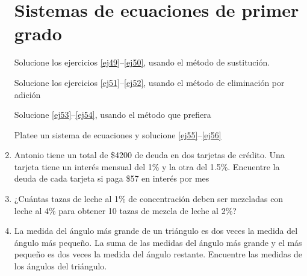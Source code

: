 \documentclass[twoside,letterpaper]{article}
\begin{document}
\begin{multicols}{2}
\begin{enumerate}
\section*{Sistemas de ecuaciones de primer grado}
Solucione los ejercicios \ref{ej49}--\ref{ej50}, usando el método de sustitución.
Solucione los ejercicios \ref{ej51}--\ref{ej52}, usando el método de eliminación por adición
Solucione \ref{ej53}--\ref{ej54}, usando el método que prefiera
Platee un sistema de ecuaciones y solucione \ref{ej55}--\ref{ej56}
\item \label{ej55} Antonio tiene un total de \$4200 de deuda en dos tarjetas de crédito. Una tarjeta tiene un interés mensual del 1\% y la otra del 1.5\%. Encuentre la deuda de cada tarjeta si paga \$57 en interés por mes
\item ¿Cuántas tazas de leche al 1\% de concentración deben ser mezcladas con leche al 4\% para obtener 10 tazas de mezcla de leche al 2\%?
\item \label{ej56} La medida del ángulo más grande de un triángulo es dos veces la medida del ángulo más pequeño. La suma de las medidas del ángulo más grande y el más pequeño es dos veces la medida del ángulo restante. Encuentre las medidas de los ángulos del triángulo.

\end{enumerate}
\end{multicols}
\end{document}
